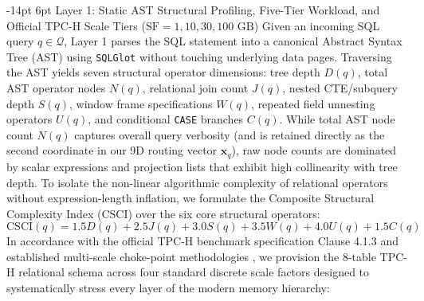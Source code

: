\documentclass[10pt,a4paper]{article}
\makeatletter
\renewcommand\subsection{\@startsection{subsection}{2}{\z@}%
  {-14pt \@plus -3pt \@minus -1.5pt}%
  {6pt \@plus 1.5pt}%
  {\normalfont\normalsize\bfseries}}
\makeatother
\begin{document}
\subsection{Layer 1: Static AST Structural Profiling, Five-Tier Workload, and Official TPC-H Scale Tiers ($\text{SF}=1, 10, 30, 100\text{ GB}$)}
Given an incoming SQL query $q \in \mathcal{Q}$, Layer 1 parses the SQL statement into a canonical Abstract Syntax Tree (AST) using \texttt{SQLGlot} \cite{mao2024sqlglot} without touching underlying data pages. Traversing the AST yields seven structural operator dimensions: tree depth $D(q)$, total AST operator nodes $N(q)$, relational join count $J(q)$, nested CTE/subquery depth $S(q)$, window frame specifications $W(q)$, repeated field unnesting operators $U(q)$, and conditional \texttt{CASE} branches $C(q)$. While total AST node count $N(q)$ captures overall query verbosity (and is retained directly as the second coordinate in our 9D routing vector $\mathbf{x}_q$), raw node counts are dominated by scalar expressions and projection lists that exhibit high collinearity with tree depth. To isolate the non-linear algorithmic complexity of relational operators without expression-length inflation, we formulate the Composite Structural Complexity Index ($\text{CSCI}$) over the six core structural operators:
\begin{equation}
    \text{CSCI}(q) = 1.5 D(q) + 2.5 J(q) + 3.0 S(q) + 3.5 W(q) + 4.0 U(q) + 1.5 C(q)
\end{equation}
In accordance with the official TPC-H benchmark specification Clause 4.1.3 \cite{tpc2022tpch} and established multi-scale choke-point methodologies \cite{boncz2014tpch, dreseler2020quantifying, kuiper2024duckdb_ooc}, we provision the 8-table TPC-H relational schema across four standard discrete scale factors designed to systematically stress every layer of the modern memory hierarchy:
\end{document}
